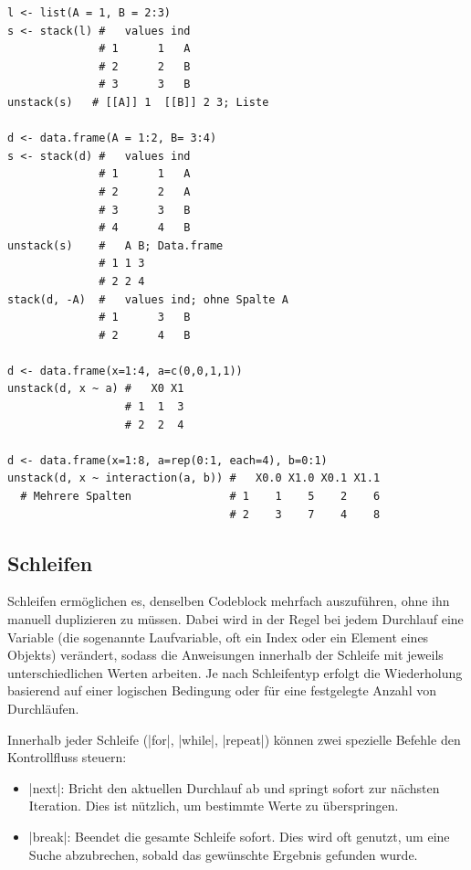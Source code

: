 \documentclass[10pt,twocolumn]{scrartcl}
\renewcommand{\lstinline}{\mycoloredinline}
\begin{document}
\begin{lstlisting}
l <- list(A = 1, B = 2:3)
s <- stack(l) #   values ind
              # 1      1   A
              # 2      2   B
              # 3      3   B
unstack(s)   # [[A]] 1  [[B]] 2 3; Liste

d <- data.frame(A = 1:2, B= 3:4)
s <- stack(d) #   values ind
              # 1      1   A
              # 2      2   A
              # 3      3   B
              # 4      4   B
unstack(s)    #   A B; Data.frame
              # 1 1 3
              # 2 2 4
stack(d, -A)  #   values ind; ohne Spalte A
              # 1      3   B
              # 2      4   B

d <- data.frame(x=1:4, a=c(0,0,1,1))
unstack(d, x ~ a) #   X0 X1
                  # 1  1  3
                  # 2  2  4

d <- data.frame(x=1:8, a=rep(0:1, each=4), b=0:1)
unstack(d, x ~ interaction(a, b)) #   X0.0 X1.0 X0.1 X1.1
  # Mehrere Spalten               # 1    1    5    2    6
                                  # 2    3    7    4    8
\end{lstlisting}


\subsection{Schleifen}

Schleifen ermöglichen es, denselben Codeblock mehrfach auszuführen, ohne ihn manuell duplizieren zu müssen. Dabei wird in der Regel bei jedem Durchlauf eine Variable (die sogenannte Laufvariable, oft ein Index oder ein Element eines Objekts) verändert, sodass die Anweisungen innerhalb der Schleife mit jeweils unterschiedlichen Werten arbeiten. Je nach Schleifentyp erfolgt die Wiederholung basierend auf einer logischen Bedingung oder für eine festgelegte Anzahl von Durchläufen.

Innerhalb jeder Schleife (\lstinline|for|, \lstinline|while|, \lstinline|repeat|) können zwei spezielle Befehle den Kontrollfluss steuern:

\begin{itemize}
\item \lstinline|next|: Bricht den aktuellen Durchlauf ab und springt sofort zur nächsten Iteration. Dies ist nützlich, um bestimmte Werte zu überspringen.
\item \lstinline|break|: Beendet die gesamte Schleife sofort. Dies wird oft genutzt, um eine Suche abzubrechen, sobald das gewünschte Ergebnis gefunden wurde.
\end{itemize}
\end{document}
